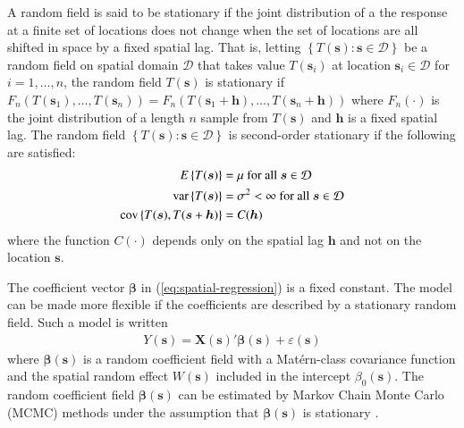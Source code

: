 \documentclass[authoryear, review, 11pt]{elsarticle}
\begin{document}
	A random field is said to be stationary if the joint distribution of a the response at a finite set of locations does not change when the set of locations are all shifted in space by a fixed spatial lag. That is, letting $\left\{T(\bm{s}) : \bm{s} \in \mathcal{D}\right\}$ be a random field on spatial domain $\mathcal{D}$ that takes value $T(\bm{s}_i)$ at location $\bm{s}_i \in \mathcal{D}$ for $i = 1, \dots, n$, the random field $T(\bm{s})$ is stationary if $F_n\left(T(\bm{s}_1), \dots, T(\bm{s}_n)\right) = F_n\left(T(\bm{s}_1+\bm{h}), \dots, T(\bm{s}_n+\bm{h})\right)$ where $F_n(\cdot)$ is the joint distribution of a length $n$ sample from $T(\bm{s})$ and $\bm{h}$ is a fixed spatial lag. The random field $\left\{T(\bm{s}) : \bm{s} \in \mathcal{D}\right\}$ is second-order stationary if the following are satisfied:
	\begin{align}
		E\left\{ T(\bm{s}) \right\} &= \mu \text{ for all } \bm{s} \in \mathcal{D} \notag \\
		\text{var}\left\{T(\bm{s})\right\} &= \sigma^2 < \infty \text{ for all } \bm{s} \in \mathcal{D} \notag \\
		\text{cov}\left\{ T(\bm{s}), T(\bm{s} + \bm{h}) \right\} &= C(\bm{h})
	\end{align}
	where the function $C(\cdot)$ depends only on the spatial lag $\bm{h}$ and not on the location $\bm{s}$.
	
	The coefficient vector $\bm{\beta}$ in (\ref{eq:spatial-regression}) is a fixed constant. The model can be made more flexible if the coefficients are described by a stationary random field. Such a model is written
\begin{align}\label{eq:SVCR-process}
    Y(\bm{s}) = \bm{X}(\bm{s})'\bm{\beta}(\bm{s}) + \varepsilon(\bm{s})
\end{align}
	where $\bm{\beta}(\bm{s})$ is a random coefficient field with a Mat\'{e}rn-class covariance function and the spatial random effect $W(\bm{s})$ included in the intercept $\beta_0(\bm{s})$. The random coefficient field $\bm{\beta}(\bm{s})$ can be estimated by Markov Chain Monte Carlo (MCMC) methods under the assumption that $\bm{\beta}(\bm{s})$ is stationary \citep{Gelfand:2003}.

\end{document}
